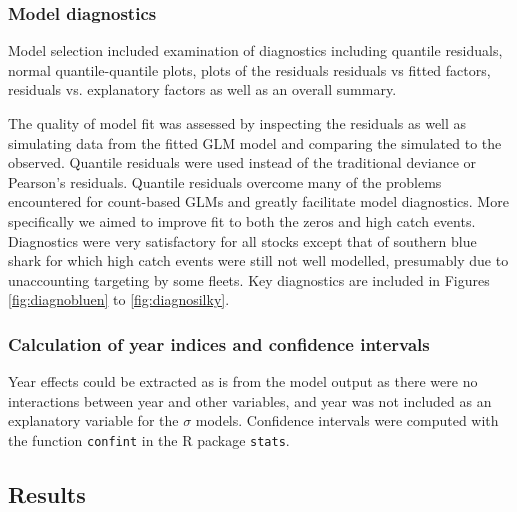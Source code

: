 \subsubsection{Model diagnostics}                                                                                      
Model selection included examination of diagnostics including quantile residuals, normal quantile-quantile plots, plots of the  residuals residuals vs fitted factors, residuals  vs. explanatory factors as well as an overall summary.

The quality of model fit was assessed by inspecting the residuals as well as simulating data from the fitted GLM model and comparing the simulated to the observed. 
Quantile residuals \citep{Dunn1996_a} were used instead of the traditional deviance or Pearson's residuals. Quantile residuals overcome many of the problems encountered for count-based GLMs and greatly facilitate model diagnostics. More specifically we aimed to improve fit to both the zeros and high catch events. Diagnostics were very satisfactory for all stocks except that of southern blue shark for which high catch events were still not well modelled, presumably due to unaccounting targeting by some fleets. Key diagnostics are included in Figures \ref{fig:diagnobluen} to \ref{fig:diagnosilky}.

\subsubsection{Calculation of year indices and confidence intervals}
Year effects could be extracted as is from the model output as there were no interactions between year and other variables, and year was not included as an explanatory variable for the $\sigma$ models. Confidence intervals were computed with the function \texttt{confint} in the R package \texttt{stats}.

\subsection{Results}
 
